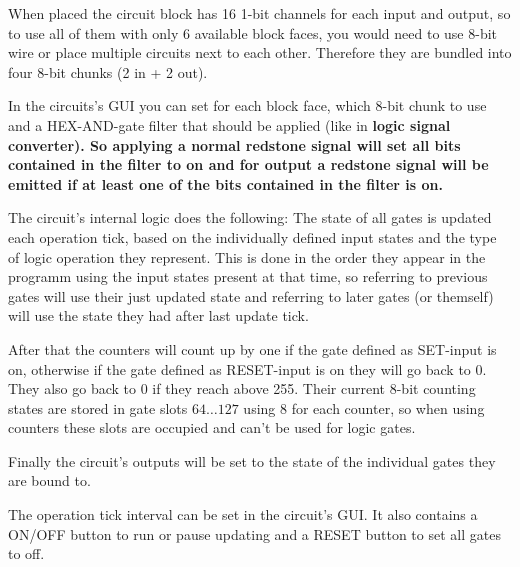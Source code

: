 \documentclass[11pt]{article} %
\begin{document}
When placed the circuit block has 16 1-bit channels for each input and output, so to use all of them with only 6 available block faces, you would need to use 8-bit wire or place multiple circuits next to each other.
Therefore they are bundled into four 8-bit chunks (2 in + 2 out). 

In the circuits's GUI you can set for each block face, which 8-bit chunk to use and a HEX-AND-gate filter that should be applied (like in \bf logic signal converter\rm ). So applying a normal redstone signal will set all bits contained in the filter to on and for output a redstone signal will be emitted if at least one of the bits contained in the filter is on.

The circuit's internal logic does the following:
The state of all gates is updated each operation tick, based on the individually defined input states and the type of logic operation they represent. This is done in the order they appear in the programm using the input states present at that time, so referring to previous gates will use their just updated state and referring to later gates (or themself) will use the state they had after last update tick.

After that the counters will count up by one if the gate defined as SET-input is on, otherwise if the gate defined as RESET-input is on they will go back to 0. They also go back to 0 if they reach above 255. Their current 8-bit counting states are stored in gate slots $64\dots127$ using 8 for each counter, so when using counters these slots are occupied and can't be used for logic gates.

Finally the circuit's outputs will be set to the state of the individual gates they are bound to.

The operation tick interval can be set in the circuit's GUI. It also contains a ON/OFF button to run or pause updating and a RESET button to set all gates to off.
\end{document}
